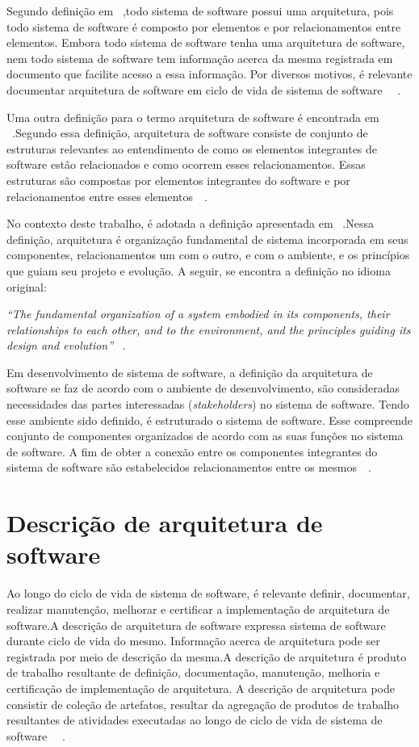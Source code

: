 Segundo definição em ~\cite{arq_01},todo sistema de software possui uma arquitetura, pois todo sistema de software é composto por elementos e por relacionamentos entre elementos. Embora todo sistema de software tenha uma arquitetura de software, nem todo sistema de software tem informação acerca da mesma registrada em documento que facilite acesso a essa informação. Por diversos motivos, é relevante documentar arquitetura de software em ciclo de vida de sistema de software ~\cite{arq_01}~\cite{Carnegie_textbook}.

Uma outra definição para o termo arquitetura de software é encontrada em ~\cite{arq_02}.Segundo essa definição, arquitetura de software consiste de conjunto de estruturas relevantes ao entendimento de como os elementos integrantes de software estão relacionados e como ocorrem esses relacionamentos. Essas estruturas são compostas por elementos integrantes do software e por relacionamentos entre esses elementos~\cite{Carnegie_textbook}~\cite{arq_02}.

No contexto deste trabalho, é adotada a definição apresentada em ~\cite{ISO_1471}.Nessa definição, arquitetura é organização fundamental de sistema incorporada em seus componentes, relacionamentos um com o outro, e com o ambiente, e os princípios que guiam seu projeto e evolução. A seguir, se encontra a definição no idioma original:


\emph{
“The fundamental organization of a system embodied in its components, their relationships to each other, and to the environment, and the principles guiding its design and evolution”
}~\cite{ISO_1471}.


Em desenvolvimento de sistema de software, a definição da  arquitetura de software se faz de acordo com o ambiente de desenvolvimento, são consideradas necessidades das partes interessadas (\emph{stakeholders}) no sistema de software. Tendo esse ambiente sido definido, é estruturado o sistema de software. Esse compreende conjunto de componentes organizados de acordo com as suas funções no sistema de software. A fim de obter a conexão entre os componentes integrantes do sistema de software são estabelecidos relacionamentos entre os mesmos~\cite{Carnegie_textbook}~\cite{ISO_1471}. 


\section{Descrição de arquitetura de software}

Ao longo do ciclo de vida de sistema de software, é relevante definir, documentar, realizar manutenção, melhorar e certificar a implementação de arquitetura de software.A descrição de arquitetura de software expressa sistema de software durante ciclo de vida do mesmo.
Informação acerca de arquitetura pode ser registrada por meio de descrição da mesma.A descrição de arquitetura é produto de trabalho resultante de definição, documentação, manutenção, melhoria e certificação de implementação de  arquitetura. A descrição de arquitetura pode consistir de coleção de artefatos, resultar da agregação de produtos de trabalho resultantes de atividades executadas ao longo de ciclo de vida de sistema de software  ~\cite{ISO_1471}~\cite{ISO_42010}. 

